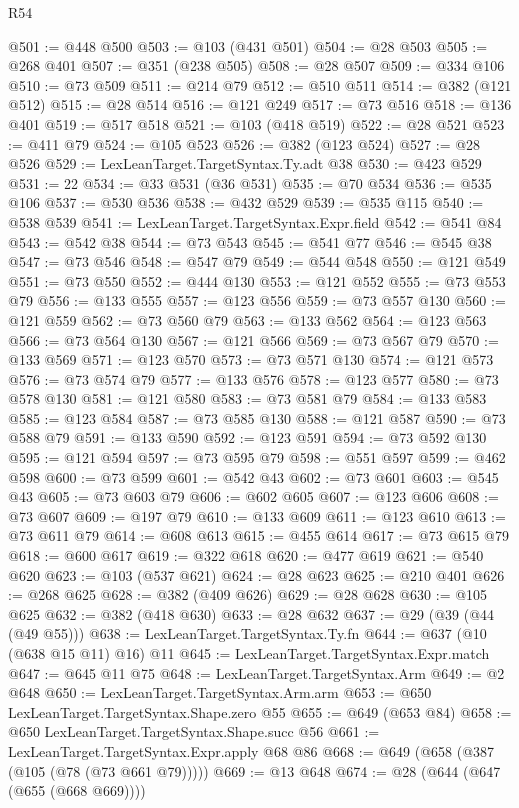 \begin{lexlean}{R54}
\begin{coremodule}
@501 := @448 @500
@503 := @103 (@431 @501)
@504 := @28 @503
@505 := @268 @401
@507 := @351 (@238 @505)
@508 := @28 @507
@509 := @334 @106
@510 := @73 @509
@511 := @214 @79
@512 := @510 @511
@514 := @382 (@121 @512)
@515 := @28 @514
@516 := @121 @249
@517 := @73 @516
@518 := @136 @401
@519 := @517 @518
@521 := @103 (@418 @519)
@522 := @28 @521
@523 := @411 @79
@524 := @105 @523
@526 := @382 (@123 @524)
@527 := @28 @526
@529 := LexLeanTarget.TargetSyntax.Ty.adt @38
@530 := @423 @529
@531 := 22
@534 := @33 @531 (@36 @531)
@535 := @70 @534
@536 := @535 @106
@537 := @530 @536
@538 := @432 @529
@539 := @535 @115
@540 := @538 @539
@541 := LexLeanTarget.TargetSyntax.Expr.field
@542 := @541 @84
@543 := @542 @38
@544 := @73 @543
@545 := @541 @77
@546 := @545 @38
@547 := @73 @546
@548 := @547 @79
@549 := @544 @548
@550 := @121 @549
@551 := @73 @550
@552 := @444 @130
@553 := @121 @552
@555 := @73 @553 @79
@556 := @133 @555
@557 := @123 @556
@559 := @73 @557 @130
@560 := @121 @559
@562 := @73 @560 @79
@563 := @133 @562
@564 := @123 @563
@566 := @73 @564 @130
@567 := @121 @566
@569 := @73 @567 @79
@570 := @133 @569
@571 := @123 @570
@573 := @73 @571 @130
@574 := @121 @573
@576 := @73 @574 @79
@577 := @133 @576
@578 := @123 @577
@580 := @73 @578 @130
@581 := @121 @580
@583 := @73 @581 @79
@584 := @133 @583
@585 := @123 @584
@587 := @73 @585 @130
@588 := @121 @587
@590 := @73 @588 @79
@591 := @133 @590
@592 := @123 @591
@594 := @73 @592 @130
@595 := @121 @594
@597 := @73 @595 @79
@598 := @551 @597
@599 := @462 @598
@600 := @73 @599
@601 := @542 @43
@602 := @73 @601
@603 := @545 @43
@605 := @73 @603 @79
@606 := @602 @605
@607 := @123 @606
@608 := @73 @607
@609 := @197 @79
@610 := @133 @609
@611 := @123 @610
@613 := @73 @611 @79
@614 := @608 @613
@615 := @455 @614
@617 := @73 @615 @79
@618 := @600 @617
@619 := @322 @618
@620 := @477 @619
@621 := @540 @620
@623 := @103 (@537 @621)
@624 := @28 @623
@625 := @210 @401
@626 := @268 @625
@628 := @382 (@409 @626)
@629 := @28 @628
@630 := @105 @625
@632 := @382 (@418 @630)
@633 := @28 @632
@637 := @29 (@39 (@44 (@49 @55)))
@638 := LexLeanTarget.TargetSyntax.Ty.fn
@644 := @637 (@10 (@638 @15 @11) @16) @11
@645 := LexLeanTarget.TargetSyntax.Expr.match
@647 := @645 @11 @75
@648 := LexLeanTarget.TargetSyntax.Arm
@649 := @2 @648
@650 := LexLeanTarget.TargetSyntax.Arm.arm
@653 := @650 LexLeanTarget.TargetSyntax.Shape.zero @55
@655 := @649 (@653 @84)
@658 := @650 LexLeanTarget.TargetSyntax.Shape.succ @56
@661 := LexLeanTarget.TargetSyntax.Expr.apply @68 @86
@668 := @649 (@658 (@387 (@105 (@78 (@73 @661 @79)))))
@669 := @13 @648
@674 := @28 (@644 (@647 (@655 (@668 @669))))

\end{coremodule}
\end{lexlean}
